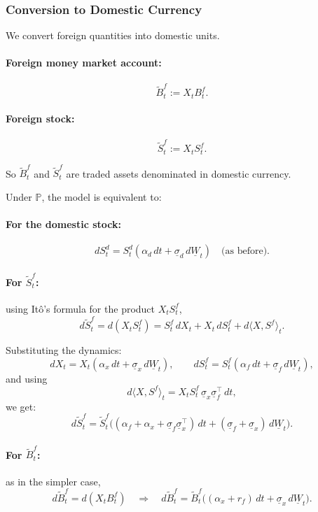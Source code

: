 \documentclass[12pt,a4paper]{article}
\theoremstyle{definition}
\begin{document}
\subsubsection{Conversion to Domestic Currency}

We convert foreign quantities into domestic units.

\paragraph{Foreign money market account:}

\[
\widetilde{B}_t^f := X_t B_t^f.
\]

\paragraph{Foreign stock:}

\[
\widetilde{S}_t^f := X_t S_t^f.
\]

So $\widetilde{B}_t^f$ and $\widetilde{S}_t^f$ are traded assets denominated in domestic currency.

Under $\mathbb{P}$, the model is equivalent to:

\paragraph{For the domestic stock:}

\[
dS_t^d = S_t^d(\alpha_d\, dt + \underline{\sigma}_d\, d\underline{W}_t) \quad \text{(as before)}.
\]

\paragraph{For $\widetilde{S}_t^f$:} using Itô's formula for the product $X_t S_t^f$,
\[
d\widetilde{S}_t^f = d(X_t S_t^f) = S_t^f\, dX_t + X_t\, dS_t^f + d\langle X, S^f \rangle_t.
\]

Substituting the dynamics:
\[
dX_t = X_t(\alpha_x\, dt + \underline{\sigma}_x\, d\underline{W}_t), \qquad dS_t^f = S_t^f(\alpha_f\, dt + \underline{\sigma}_f\, d\underline{W}_t),
\]
and using
\[
d\langle X, S^f \rangle_t = X_t S_t^f\, \underline{\sigma}_x \underline{\sigma}_f^\top\, dt,
\]
we get:
\[
d\widetilde{S}_t^f = \widetilde{S}_t^f\big((\alpha_f + \alpha_x + \underline{\sigma}_f \underline{\sigma}_x^\top)\, dt + (\underline{\sigma}_f + \underline{\sigma}_x)\, d\underline{W}_t\big).
\]

\paragraph{For $\widetilde{B}_t^f$:} as in the simpler case,
\[
d\widetilde{B}_t^f = d(X_t B_t^f) \quad \Rightarrow \quad d\widetilde{B}_t^f = \widetilde{B}_t^f\big((\alpha_x + r_f)\, dt + \underline{\sigma}_x\, d\underline{W}_t\big).
\]
\end{document}
